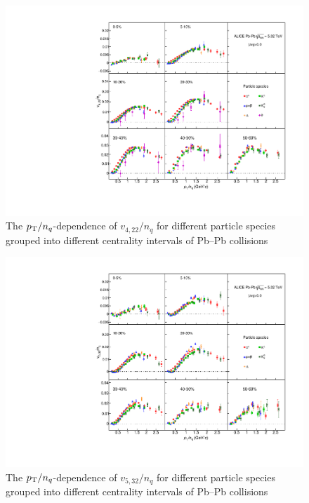 \documentclass[ALICE,manyauthors]{cernphprep}
\begin{document}
\begin{figure}[!htb]
\begin{center}
\includegraphics[scale=0.82]{figures/scaling/All_v422_gap00_NCQ_3by3.pdf}
\end{center}
\caption{The $p_{\rm{T}}/n_{q}$-dependence of $v_{4,22}/n_{q}$ for different particle species grouped into different centrality intervals of Pb--Pb collisions \sNN}
\label{v422_NCQ}
\end{figure}

\begin{figure}[!htb]
\begin{center}
\includegraphics[scale=0.82]{figures/scaling/All_v523_gap00_NCQ_3by3.pdf}

\end{center}
\caption{The $p_{\rm{T}}/n_{q}$-dependence of $v_{5,32}/n_{q}$ for different particle species grouped into different centrality intervals of Pb--Pb collisions \sNN}
\label{v523_NCQ}
\end{figure}
\end{document}
